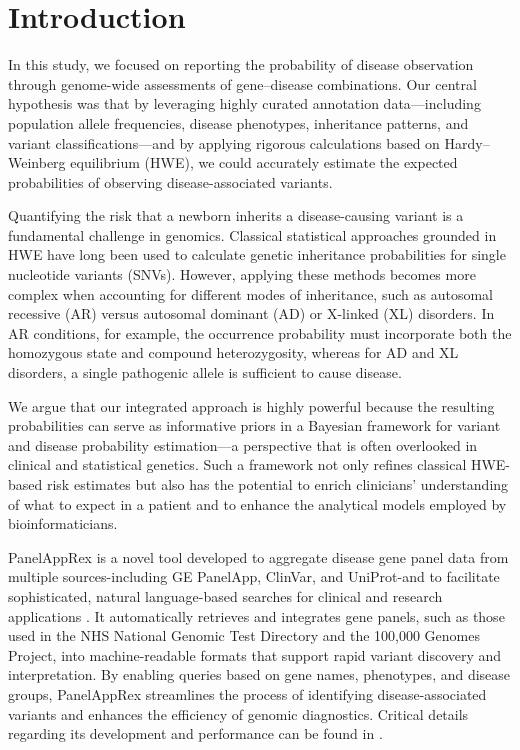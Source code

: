 \section{Introduction}

In this study, we focused on reporting the probability of disease observation through genome-wide assessments of gene–disease combinations. Our central hypothesis was that by leveraging highly curated annotation data—including population allele frequencies, disease phenotypes, inheritance patterns, and variant classifications—and by applying rigorous calculations based on Hardy–Weinberg equilibrium (HWE), we could accurately estimate the expected probabilities of observing disease-associated variants.

Quantifying the risk that a newborn inherits a disease-causing variant is a fundamental challenge in genomics. Classical statistical approaches grounded in HWE \cite{MayoCentury2008, AbramovsHardyWeinberg2020} have long been used to calculate genetic inheritance probabilities for single nucleotide variants (SNVs). However, applying these methods becomes more complex when accounting for different modes of inheritance, such as autosomal recessive (AR) versus autosomal dominant (AD) or X-linked (XL) disorders. In AR conditions, for example, the occurrence probability must incorporate both the homozygous state and compound heterozygosity, whereas for AD and XL disorders, a single pathogenic allele is sufficient to cause disease.

We argue that our integrated approach is highly powerful because the resulting probabilities can serve as informative priors in a Bayesian framework for variant and disease probability estimation—a perspective that is often overlooked in clinical and statistical genetics. Such a framework not only refines classical HWE-based risk estimates but also has the potential to enrich clinicians’ understanding of what to expect in a patient and to enhance the analytical models employed by bioinformaticians.

PanelAppRex is a novel tool developed to aggregate disease gene panel data from multiple sources-including GE PanelApp, ClinVar, and UniProt-and to facilitate sophisticated, natural language-based searches for clinical and research applications
\cite{lawless_panelapprex_2025}. It automatically retrieves and integrates gene panels, such as those used in the NHS National Genomic Test Directory and the 100,000 Genomes Project, into machine-readable formats that support rapid variant discovery and interpretation. By enabling queries based on gene names, phenotypes, and disease groups, PanelAppRex streamlines the process of identifying disease-associated variants and enhances the efficiency of genomic diagnostics. Critical details regarding its development and performance can be found in \cite{martin_panelapp_2019, landrum_clinvar_2018, the_uniprot_consortium_uniprot_2025}.

